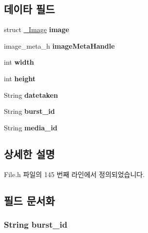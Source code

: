\subsection*{데이타 필드}
\begin{DoxyCompactItemize}
\item 
\hypertarget{struct___image_extends_a24c96542e7d59186d5d414503928920a}{struct \hyperlink{struct___image}{\-\_\-\-Image} {\bfseries image}}\label{struct___image_extends_a24c96542e7d59186d5d414503928920a}

\item 
\hypertarget{struct___image_extends_a9cb994692e8daaf094623152f5f88d53}{image\-\_\-meta\-\_\-h {\bfseries image\-Meta\-Handle}}\label{struct___image_extends_a9cb994692e8daaf094623152f5f88d53}

\item 
\hypertarget{struct___image_extends_a2474a5474cbff19523a51eb1de01cda4}{int {\bfseries width}}\label{struct___image_extends_a2474a5474cbff19523a51eb1de01cda4}

\item 
\hypertarget{struct___image_extends_ad12fc34ce789bce6c8a05d8a17138534}{int {\bfseries height}}\label{struct___image_extends_ad12fc34ce789bce6c8a05d8a17138534}

\item 
\hypertarget{struct___image_extends_a077fc46f97fd76e21ef941afe99e6eaa}{String {\bfseries datetaken}}\label{struct___image_extends_a077fc46f97fd76e21ef941afe99e6eaa}

\item 
\hypertarget{struct___image_extends_ac42679c44413eda88288568352b90dd9}{String {\bfseries burst\-\_\-id}}\label{struct___image_extends_ac42679c44413eda88288568352b90dd9}

\item 
\hypertarget{struct___image_extends_af61699ef5054dcf075cbf29d59ed8d3c}{String {\bfseries media\-\_\-id}}\label{struct___image_extends_af61699ef5054dcf075cbf29d59ed8d3c}

\end{DoxyCompactItemize}


\subsection{상세한 설명}


File.\-h 파일의 145 번째 라인에서 정의되었습니다.



\subsection{필드 문서화}
\hypertarget{struct___image_extends_ac42679c44413eda88288568352b90dd9}{
\subsubsection[{burst\-\_\-id}]{\setlength{\rightskip}{0pt plus 5cm}String burst\-\_\-id}}\label{struct___image_extends_ac42679c44413eda88288568352b90dd9}


